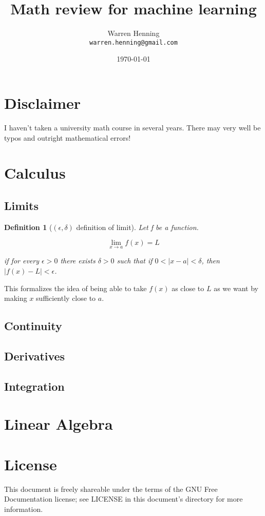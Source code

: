 \documentclass{article}
\begin{document}
\title{Math review for machine learning}
\author{Warren Henning\\\texttt{warren.henning@gmail.com}}
\date{\today}

\maketitle

\section{Disclaimer}

I haven't taken a university math course in several years. There may very well be typos and outright mathematical errors!

\section{Calculus}

\subsection{Limits}

\newtheorem{definition}{Definition}

\begin{definition}[$(\epsilon, \delta)$ definition of limit]

Let {\it f} be a function. 

\begin{equation}
\lim_{x \to a} f(x) = L
\end{equation}

if for every $\epsilon > 0$ there exists $\delta > 0$ such that if $0 < |x-a| < \delta$, then $|f(x) - L| < \epsilon$.
 
\end{definition}

This formalizes the idea of being able to take $f(x)$ as close to $L$ as we want by making $x$ sufficiently close to $a$.

\subsection{Continuity}

\subsection{Derivatives}

\subsection{Integration}

\section{Linear Algebra}

\section{License}

This document is freely shareable under the terms of the GNU Free Documentation license; see LICENSE in this document's directory for more information.
\end{document}
